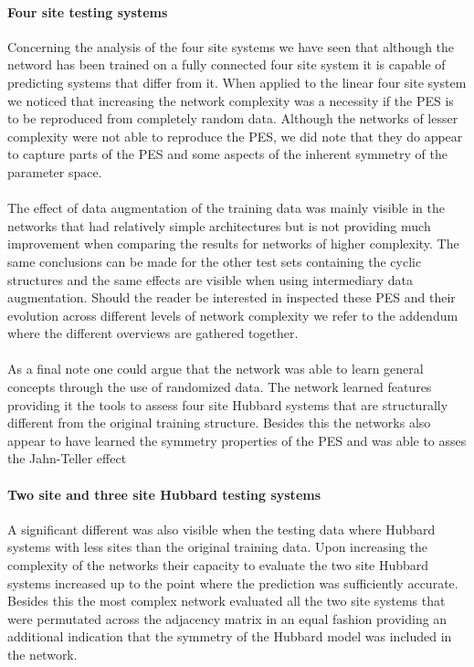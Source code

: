 \documentclass[12pt]{article}
\begin{document}
\paragraph{Four site testing systems}
Concerning the analysis of the four site systems we have seen that although the netword has been trained on a fully connected four site system it is capable of predicting systems that differ from it. When applied to the linear four site system we noticed that increasing the network complexity was a necessity if the PES is to be reproduced from completely random data. Although the networks of lesser complexity were not able to reproduce the PES, we did note that they do appear to capture parts of the PES and some aspects of the inherent symmetry of the parameter space.
\\
\\
The effect of data augmentation of the training data was mainly visible in the networks that had relatively simple architectures but is not providing much improvement when comparing the results for networks of higher complexity. The same conclusions can be made for the other test sets containing the cyclic structures and the same effects are visible when using intermediary data augmentation. Should the reader be interested in inspected these PES and their evolution across different levels of network complexity we refer to the addendum where the different overviews are gathered together.
\\
\\
As a final note one could argue that the network was able to learn general concepts through the use of randomized data. The network learned features providing it the tools to assess four site Hubbard systems that are structurally different from the original training structure. Besides this the networks also appear to have learned the symmetry properties of the PES and was able to asses the Jahn-Teller effect

\paragraph{Two site and three site Hubbard testing systems}
A significant different was also visible when the testing data where Hubbard systems with less sites than the original training data. Upon increasing the complexity of the networks their capacity to evaluate the two site Hubbard systems increased up to the point where the prediction was sufficiently accurate. Besides this the most complex network evaluated all the two site systems that were permutated across the adjacency matrix in an equal fashion providing an additional indication that the symmetry of the Hubbard model was included in the network.   
\end{document}
